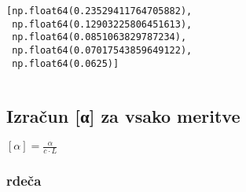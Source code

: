 \documentclass[11pt]{article}
\makeatletter
\newcommand{\boxspacing}{\kern\kvtcb@left@rule\kern\kvtcb@boxsep}
\newcommand{\prompt}[4]{
        {\ttfamily\llap{{\color{#2}[#3]:\hspace{3pt}#4}}\vspace{-\baselineskip}}
    }
\makeatother
\begin{document}
            \begin{tcolorbox}[breakable, size=fbox, boxrule=.5pt, pad at break*=1mm, opacityfill=0]
\prompt{Out}{outcolor}{276}{\boxspacing}
\begin{Verbatim}[commandchars=\\\{\}]
[np.float64(0.23529411764705882),
 np.float64(0.12903225806451613),
 np.float64(0.0851063829787234),
 np.float64(0.07017543859649122),
 np.float64(0.0625)]
\end{Verbatim}
\end{tcolorbox}
        
    \begin{tcolorbox}[breakable, size=fbox, boxrule=1pt, pad at break*=1mm,colback=cellbackground, colframe=cellborder]
\prompt{In}{incolor}{ }{\boxspacing}
\begin{Verbatim}[commandchars=\\\{\}]

\end{Verbatim}
\end{tcolorbox}

    \hypertarget{izraux10dun-ux3b1-za-vsako-meritve}{%
\subsection{Izračun {[}α{]} za vsako
meritve}\label{izraux10dun-ux3b1-za-vsako-meritve}}

\([\alpha] = \frac{\alpha}{c \cdot L}\)

    \hypertarget{rdeux10da}{%
\subsubsection{rdeča}\label{rdeux10da}}
\end{document}
